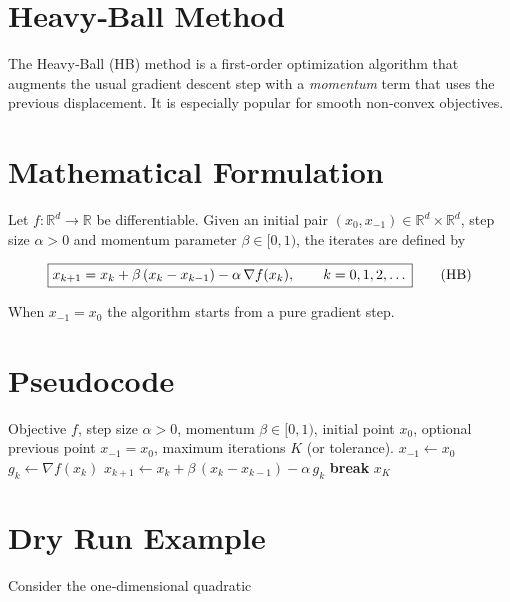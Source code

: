 \documentclass{article}
\begin{document}
\section*{Heavy‑Ball Method}

The Heavy‑Ball (HB) method is a first‑order optimization algorithm that augments the usual gradient descent step with a \emph{momentum} term that uses the previous displacement.  It is especially popular for smooth non‑convex objectives.

\section*{Mathematical Formulation}

Let $f:\mathbb{R}^{d}\rightarrow\mathbb{R}$ be differentiable.  
Given an initial pair $(x_{0},x_{-1})\in\mathbb{R}^{d}\times\mathbb{R}^{d}$, step size $\alpha>0$ and momentum parameter $\beta\in[0,1)$, the iterates are defined by  

\[
\boxed{%
x_{k+1}=x_{k}+\beta\,(x_{k}-x_{k-1})-\alpha\,\nabla f(x_{k}),\qquad k=0,1,2,\dots
}
\tag{HB}
\]

When $x_{-1}=x_{0}$ the algorithm starts from a pure gradient step.

\section*{Pseudocode}

\begin{algorithm}[H]
\caption{Heavy‑Ball (HB) Method}
\begin{algorithmic}[1]
\Require Objective $f$, step size $\alpha>0$, momentum $\beta\in[0,1)$,
        initial point $x_{0}$, optional previous point $x_{-1}=x_{0}$,
        maximum iterations $K$ (or tolerance).
\State $x_{-1}\gets x_{0}$ 
    \State $g_{k}\gets \nabla f(x_{k})$
    \State $x_{k+1}\gets x_{k}+\beta\,(x_{k}-x_{k-1})-\alpha\,g_{k}$
        \State \textbf{break}
    \EndIf
\EndFor
\State \Return $x_{K}$
\end{algorithmic}
\end{algorithm}

\section*{Dry Run Example}

Consider the one‑dimensional quadratic  
\end{document}

